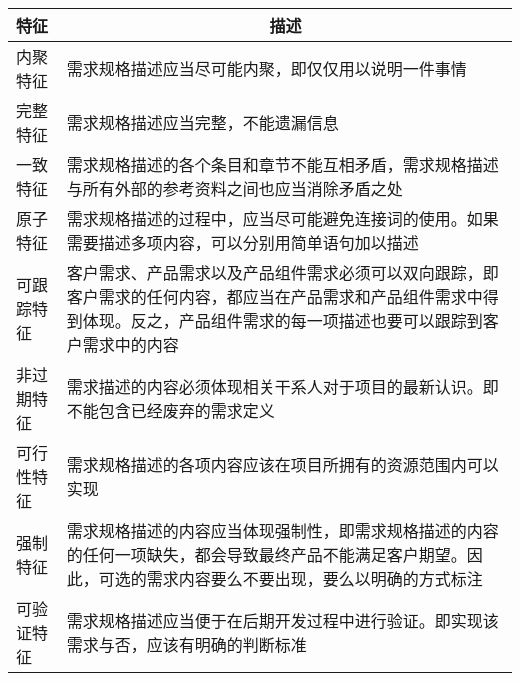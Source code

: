 \vspace{-0.5em}
\begin{spacing}{1.2}
    \centering
    \begin{longtable}{|m{2cm}<{\centering}|m{13cm}|}
        \hline
        \textbf{特征} & \multicolumn{1}{c|}{\textbf{描述}}                                                         \\ \hline
        内聚特征        & 需求规格描述应当尽可能内聚，即仅仅用以说明一件事情                                                                \\ \hline
        完整特征        & 需求规格描述应当完整，不能遗漏信息                                                                        \\ \hline
        一致特征        & 需求规格描述的各个条目和章节不能互相矛盾，需求规格描述与所有外部的参考资料之间也应当消除矛盾之处                                         \\ \hline
        原子特征        & 需求规格描述的过程中，应当尽可能避免连接词的使用。如果需要描述多项内容，可以分别用简单语句加以描述                                        \\ \hline
        可跟踪特征       & 客户需求、产品需求以及产品组件需求必须可以双向跟踪，即客户需求的任何内容，都应当在产品需求和产品组件需求中得到体现。反之，产品组件需求的每一项描述也要可以跟踪到客户需求中的内容 \\ \hline
        非过期特征       & 需求描述的内容必须体现相关干系人对于项目的最新认识。即不能包含已经废弃的需求定义                                                 \\ \hline
        可行性特征       & 需求规格描述的各项内容应该在项目所拥有的资源范围内可以实现                                                            \\ \hline
        强制特征        & 需求规格描述的内容应当体现强制性，即需求规格描述的内容的任何一项缺失，都会导致最终产品不能满足客户期望。因此，可选的需求内容要么不要出现，要么以明确的方式标注          \\ \hline
        可验证特征       & 需求规格描述应当便于在后期开发过程中进行验证。即实现该需求与否，应该有明确的判断标准                                               \\ \hline
    \end{longtable}
\end{spacing}
\vspace{-1em}